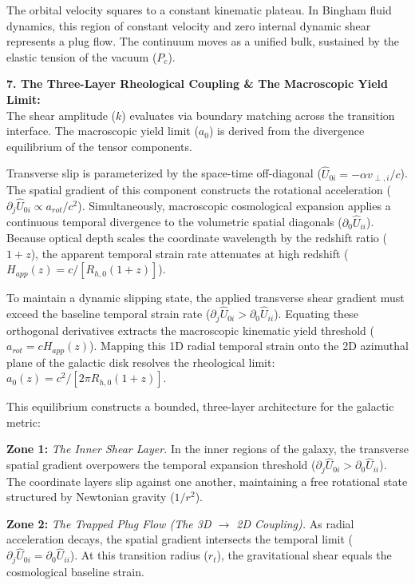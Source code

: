 The orbital velocity squares to a constant kinematic plateau. In Bingham fluid dynamics, this region of constant velocity and zero internal dynamic shear represents a plug flow. The continuum moves as a unified bulk, sustained by the elastic tension of the vacuum ($P_c$). 

\textbf{7. The Three-Layer Rheological Coupling \& The Macroscopic Yield Limit:} \\ 
The shear amplitude ($k$) evaluates via boundary matching across the transition interface. The macroscopic yield limit ($a_0$) is derived from the divergence equilibrium of the tensor components. %

Transverse slip is parameterized by the space-time off-diagonal ($\hat{U}_{0i} = -\alpha v_{\perp,i}/c$). The spatial gradient of this component constructs the rotational acceleration ($\partial_j \hat{U}_{0i} \propto a_{rot}/c^2$). 
Simultaneously, macroscopic cosmological expansion applies a continuous temporal divergence to the volumetric spatial diagonals ($\partial_0 \hat{U}_{ii}$). Because optical depth scales the coordinate wavelength by the redshift ratio ($1+z$), the apparent temporal strain rate attenuates at high redshift ($H_{app}(z) = c/[R_{h,0}(1+z)]$). 

To maintain a dynamic slipping state, the applied transverse shear gradient must exceed the baseline temporal strain rate ($\partial_j \hat{U}_{0i} > \partial_0 \hat{U}_{ii}$). 
Equating these orthogonal derivatives extracts the macroscopic kinematic yield threshold ($a_{rot} = c H_{app}(z)$). Mapping this 1D radial temporal strain onto the 2D azimuthal plane of the galactic disk resolves the rheological limit: $a_0(z) = c^2 / [2\pi R_{h,0} (1+z)]$. 

This equilibrium constructs a bounded, three-layer architecture for the galactic metric: 

\textbf{Zone 1:}  \textit{The Inner Shear Layer.} 
In the inner regions of the galaxy, the transverse spatial gradient overpowers the temporal expansion threshold ($\partial_j \hat{U}_{0i} > \partial_0 \hat{U}_{ii}$). The coordinate layers slip against one another, maintaining a free rotational state structured by Newtonian gravity ($1/r^2$). 

\textbf{Zone 2:}  \textit{The Trapped Plug Flow (The 3D $\rightarrow$ 2D Coupling).} 
As radial acceleration decays, the spatial gradient intersects the temporal limit ($\partial_j \hat{U}_{0i} = \partial_0 \hat{U}_{ii}$). At this transition radius ($r_t$), the gravitational shear equals the cosmological baseline strain. 

